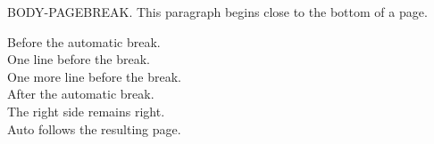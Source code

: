 \documentclass[twoside]{article}
\begin{document}
BODY-PAGEBREAK. This paragraph begins close to the bottom of a page.
\par\vspace{5cm}
\noindent Before the automatic break.\\
One line before the break.\\
One more line before the break.\\
After the automatic break.\\
The right side remains right.\\
Auto follows the resulting page.
\end{document}
